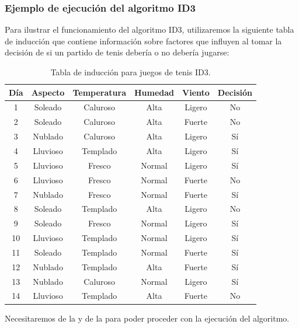 \subsubsection{Ejemplo de ejecución del algoritmo ID3} \label{ejecucionID3}

Para ilustrar el funcionamiento del algoritmo ID3, utilizaremos la siguiente tabla de inducción que contiene información sobre factores que influyen al tomar la decisión de si un partido de tenis debería o no debería jugarse:

\begin{table}[!hb]
	\begin{center}
		\label{tab:tablaInduccionID3}
		\begin{tabular}{c|c|c|c|c|c}
			\textbf{Día} & \textbf{Aspecto} & \textbf{Temperatura} & \textbf{Humedad} & \textbf{Viento} & \textbf{Decisión}\\
			\hline
			1 & Soleado & Caluroso & Alta & Ligero & No\\
			2 & Soleado & Caluroso & Alta & Fuerte & No\\
			3 & Nublado & Caluroso & Alta & Ligero & Sí\\
			4 & Lluvioso & Templado & Alta & Ligero & Sí\\
			5 & Lluvioso & Fresco & Normal & Ligero & Sí\\
			6 & Lluvioso & Fresco & Normal & Fuerte & No\\
			7 & Nublado & Fresco & Normal & Fuerte & Sí\\
			8 & Soleado & Templado & Alta & Ligero & No\\
			9 & Soleado & Fresco & Normal & Ligero & Sí\\
			10 & Lluvioso & Templado & Normal & Ligero & Sí\\
			11 & Soleado & Templado & Normal & Fuerte & Sí\\
			12 & Nublado & Templado & Alta & Fuerte & Sí\\
			13 & Nublado & Caluroso & Normal & Ligero & Sí\\
			14 & Lluvioso & Templado & Alta & Fuerte & No\\
		\end{tabular}
	\end{center}
	\caption{Tabla de inducción para juegos de tenis ID3.}
\end{table}

Necesitaremos de la  y de la  para poder proceder con la ejecución del algoritmo.\\

